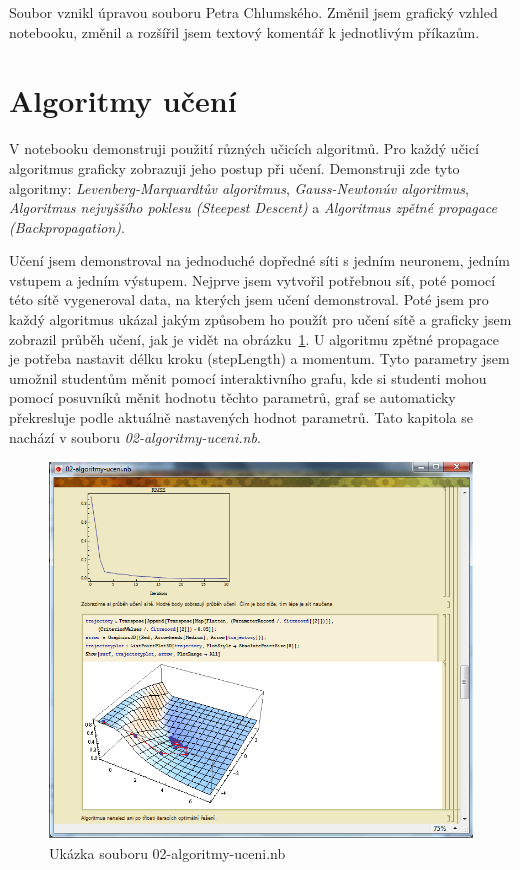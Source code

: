 \documentclass[11pt,twoside,a4paper]{book}
\begin{document}
Soubor vznikl úpravou souboru Petra Chlumského. Změnil jsem grafický vzhled notebooku, změnil a rozšířil jsem textový komentář k jednotlivým příkazům.

\section{Algoritmy učení}
V notebooku demonstruji použití různých učicích algoritmů. Pro každý učicí algoritmus graficky zobrazuji jeho postup při učení. Demonstruji zde tyto algoritmy: \textit{Levenberg-Marquardtův algoritmus}, \textit{Gauss-Newtonúv algoritmus}, \textit{Algoritmus nejvyššího poklesu (Steepest Descent)} a \textit{Algoritmus zpětné propagace (Backpropagation)}.

Učení jsem demonstroval na jednoduché dopředné síti s jedním neuronem, jedním vstupem a jedním výstupem. Nejprve jsem vytvořil potřebnou síť, poté pomocí této sítě vygeneroval data, na kterých jsem učení demonstroval. Poté jsem pro každý algoritmus ukázal jakým způsobem ho použít pro učení sítě a graficky jsem zobrazil průběh učení, jak je vidět na obrázku~\ref{fig:algoritmy-uceni}. U algoritmu zpětné propagace je potřeba nastavit délku kroku (stepLength) a momentum. Tyto parametry jsem umožnil studentům měnit pomocí interaktivního grafu, kde si studenti mohou pomocí posuvníků měnit hodnotu těchto parametrů, graf se automaticky překresluje podle aktuálně nastavených hodnot parametrů. Tato kapitola se nachází v souboru \textit{02-algoritmy-uceni.nb}.

\begin{figure}[h!]
\begin{center}
\includegraphics[height=10cm]{figures/ukazka02.png}
\caption{Ukázka souboru 02-algoritmy-uceni.nb}
\label{fig:algoritmy-uceni}
\end{center}
\end{figure}
\newpage
\end{document}
